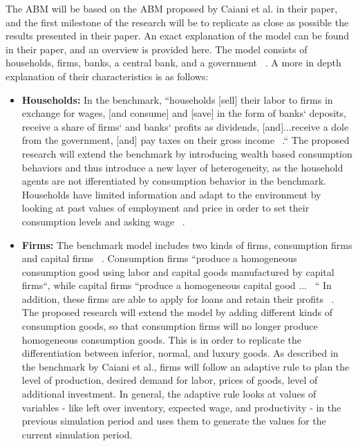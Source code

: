\documentclass[11pt]{article}
\begin{document}
The ABM will be based on the ABM proposed by Caiani et al. in their paper, and
the first milestone of the research will be to replicate as close as possible the
results presented in their paper. An exact explanation of the model can be found
in their paper, and an overview is provided here. The model consists of households,
firms, banks, a central bank, and a government  ~\cite{Caiani-benchmark-paper}.
A more in depth explanation of their characteristics is as follows:
\begin{itemize}
  \item \textbf{Households:} In the benchmark, ``households [sell] their labor
  to firms in exchange for wages, [and consume] and [save] in the form of banks`
  deposits, receive a share of firms` and banks` profits as dividends,
  [and]...receive a dole from the government, [and] pay taxes on their gross
  income  ~\cite{Caiani-benchmark-paper}.`` The proposed research will extend
  the benchmark by introducing wealth based consumption behaviors and thus
  introduce a new layer of heterogeneity, as the household agents are not
  ifferentiated by consumption behavior in the benchmark. Households have limited
  information and adapt to the environment by looking at past values of employment
  and price in order to set their consumption levels and asking wage  ~\cite{Caiani-benchmark-paper}.
  \item \textbf{Firms:} The benchmark model includes two kinds of firms, consumption
  firms and capital firms  ~\cite{Caiani-benchmark-paper}. Consumption firms
  ``produce a homogeneous consumption good using labor and capital goods manufactured
  by capital firms``, while capital firms ``produce a homogeneous capital good ... ~\cite{Caiani-benchmark-paper}``
  In addition, these firms are able to apply for loans and retain their profits  ~\cite{Caiani-benchmark-paper}.
   The proposed research will extend the model by adding different kinds of
   consumption goods, so that consumption firms will no longer produce homogeneous
   consumption goods. This is in order to replicate the differentiation between
   inferior, normal, and luxury goods. As described in the benchmark by Caiani et al.,
   firms will follow an adaptive rule to plan the level of production, desired
   demand for labor, prices of goods, level of additional investment. In general,
   the adaptive rule looks at values of variables - like left over inventory,
   expected wage, and productivity - in the previous simulation period and uses
   them to generate the values for the current simulation period.

\end{itemize}
\end{document}
